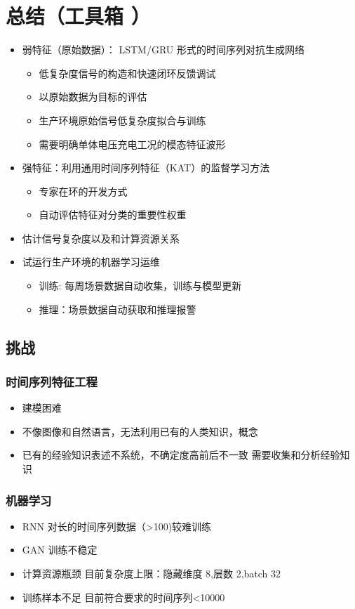 \documentclass[a4paper, 11pt]{article}
\begin{document}
\section*{总结（工具箱 ）}
\label{sec:org505ddb1}
\begin{itemize}
\item 弱特征（原始数据）： LSTM/GRU 形式的时间序列对抗生成网络
\begin{itemize}
\item 低复杂度信号的构造和快速闭环反馈调试
\item 以原始数据为目标的评估
\item 生产环境原始信号低复杂度拟合与训练
\item 需要明确单体电压充电工况的模态特征波形
\end{itemize}
\item 强特征：利用通用时间序列特征（KAT）的监督学习方法
\begin{itemize}
\item 专家在环的开发方式
\item 自动评估特征对分类的重要性权重
\end{itemize}
\item 估计信号复杂度以及和计算资源关系
\item 试运行生产环境的机器学习运维
\begin{itemize}
\item 训练: 每周场景数据自动收集，训练与模型更新
\item 推理：场景数据自动获取和推理报警
\end{itemize}
\end{itemize}
\subsection*{挑战}
\label{sec:orge6f60c0}
\subsubsection*{时间序列特征工程}
\label{sec:org66a3be2}
\begin{itemize}
\item 建模困难
\item 不像图像和自然语言，无法利用已有的人类知识，概念
\item 已有的经验知识表述不系统，不确定度高前后不一致
需要收集和分析经验知识
\end{itemize}
\subsubsection*{机器学习}
\label{sec:org80aee91}
\begin{itemize}
\item RNN 对长的时间序列数据（>100)较难训练
\item GAN 训练不稳定
\item 计算资源瓶颈
目前复杂度上限：隐藏维度 8,层数 2,batch 32
\item 训练样本不足
目前符合要求的时间序列<10000
\end{itemize}
\end{document}
